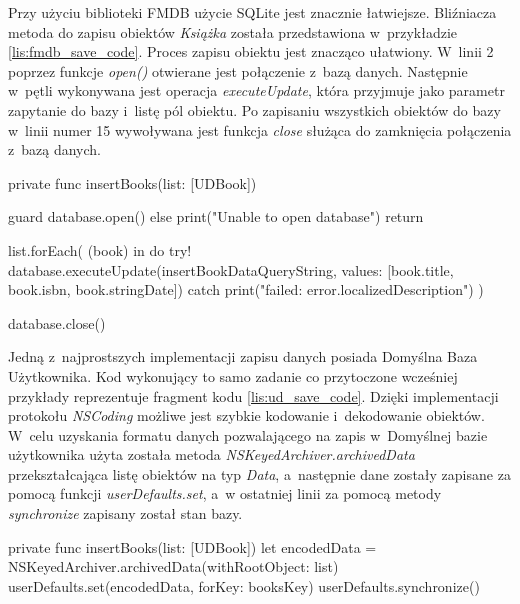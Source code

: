 Przy użyciu biblioteki FMDB użycie SQLite jest znacznie łatwiejsze. Bliźniacza metoda do zapisu obiektów \textit{Książka} została przedstawiona w~przykładzie \ref{lis:fmdb_save_code}. Proces zapisu obiektu jest znacząco ułatwiony. W~linii 2 poprzez funkcje \textit{open()} otwierane jest połączenie z~bazą danych. Następnie w~pętli wykonywana jest operacja \textit{executeUpdate}, która przyjmuje jako parametr zapytanie do bazy i~listę pól obiektu. Po zapisaniu wszystkich obiektów do bazy w~linii numer 15 wywoływana jest funkcja \textit{close} służąca do zamknięcia połączenia z~bazą danych. 

\begin{code}[
		language=swift,
		caption={Przykład zapisu obiektu FMDB},
		label={lis:fmdb_save_code},
	]
    private func insertBooks(list: [UDBook]) {
        guard database.open() else {
            print("Unable to open database")
            return
        }
        
        list.forEach({ (book) in
            do {
                try! database.executeUpdate(insertBookDataQueryString, values: [book.title, book.isbn, book.stringDate])
            } catch {
                print("failed: error.localizedDescription")
            }
        })
        
        database.close()
    }
\end{code}
\bigskip

Jedną z~najprostszych implementacji zapisu danych posiada Domyślna Baza Użytkownika. Kod wykonujący to samo zadanie co przytoczone wcześniej przykłady reprezentuje fragment kodu \ref{lis:ud_save_code}. Dzięki implementacji protokołu \textit{NSCoding} możliwe jest szybkie kodowanie i~dekodowanie obiektów. W~celu uzyskania formatu danych pozwalającego na zapis w~Domyślnej bazie użytkownika użyta została metoda \textit{NSKeyedArchiver.archivedData} przekształcająca listę obiektów na typ \textit{Data}, a~następnie dane zostały zapisane za pomocą funkcji \textit{userDefaults.set}, a~w ostatniej linii za pomocą metody \textit{synchronize} zapisany został stan bazy. 

\begin{code}[
		language=swift,
		caption={Przykład zapisu obiektu User Defaults},
		label={lis:ud_save_code},
	]
    private func insertBooks(list: [UDBook]) {
        let encodedData = NSKeyedArchiver.archivedData(withRootObject: list)
        userDefaults.set(encodedData, forKey: booksKey)
        userDefaults.synchronize()
    }
\end{code}
\bigskip

